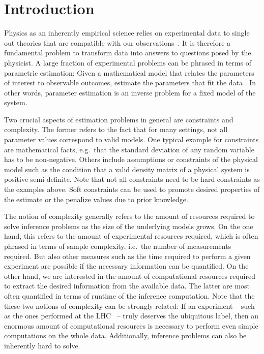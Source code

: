 
\chapter{Introduction}%
\label{chap:introduction}


Physics as an inherently empirical science relies on experimental data to single out theories that are compatible with our observations~\cite{Popper}.
It is therefore a fundamental problem to transform data into answers to questions posed by the physicist.
A large fraction of experimental problems can be phrased in terms of parametric estimation:
Given a mathematical model that relates the parameters of interest to observable outcomes, estimate the parameters that fit the data .
In other words, parameter estimation is an inverse problem for a fixed model of the system.

Two crucial aspects of estimation problems in general are constraints and complexity.
The former refers to the fact that for many settings, not all parameter values correspond to valid models.
One typical example for constraints are mathematical facts, e.g.\ that the standard deviation of any random variable has to be non-negative.
Others include assumptions or constraints of the physical model such as the condition that a valid density matrix of a physical system is positive semi-definite.
Note that not all constraints need to be hard constraints as the examples above.
Soft constraints can be used to promote desired properties of the estimate or the penalize values due to prior knowledge.

The notion of complexity generally refers to the amount of resources required to solve inference problems as the size of the underlying models grows.
On the one hand, this refers to the amount of experimental resources required, which is often phrased in terms of sample complexity, i.e.\ the number of measurements required.
But also other measures such as the time required to perform a given experiment are possible if the necessary information can be quantified.
On the other hand, we are interested in the amount of computational resources required to extract the desired information from the available data.
The latter are most often quantified in terms of runtime of the inference computation.
Note that the these two notions of complexity can be strongly related:
If an experiment -- such as the ones performed at the LHC~\cite{} -- truly deserves the ubiquitous  label, then an enormous amount of computational resources is necessary to perform even simple computations on the whole data.
Additionally, inference problems can also be inherently hard to solve.\\



